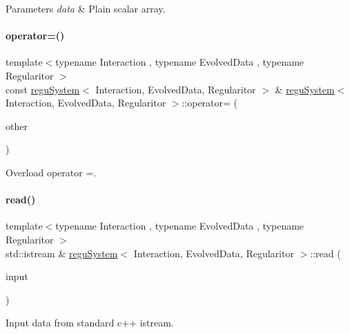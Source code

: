 \begin{DoxyParams}{Parameters}
{\em data} & Plain scalar array. \\
\hline
\end{DoxyParams}
\mbox{\label{classregu_system_a894081d40cb90418f791ab52e3c64d5f}} 
\paragraph{\texorpdfstring{operator=()}{operator=()}}
{\footnotesize\ttfamily template$<$typename Interaction , typename Evolved\+Data , typename Regularitor $>$ \\
const \mbox{\hyperlink{classregu_system}{regu\+System}}$<$ Interaction, Evolved\+Data, Regularitor $>$ \& \mbox{\hyperlink{classregu_system}{regu\+System}}$<$ Interaction, Evolved\+Data, Regularitor $>$\+::operator= (\begin{DoxyParamCaption}\item[{const \mbox{\hyperlink{classregu_system}{regu\+System}}$<$ Interaction, Evolved\+Data, Regularitor $>$ \&}]{other }\end{DoxyParamCaption})}



Overload operator =. 

\mbox{\label{classregu_system_ae26daf3f6058c1be67fb00366706e2e4}} 
\paragraph{\texorpdfstring{read()}{read()}}
{\footnotesize\ttfamily template$<$typename Interaction , typename Evolved\+Data , typename Regularitor $>$ \\
std\+::istream \& \mbox{\hyperlink{classregu_system}{regu\+System}}$<$ Interaction, Evolved\+Data, Regularitor $>$\+::read (\begin{DoxyParamCaption}\item[{std\+::istream \&}]{input }\end{DoxyParamCaption})}



Input data from standard c++ istream. 

